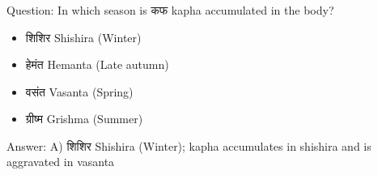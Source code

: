 %
%
%

%
%
%

\begin{frame}[fragile]\frametitle{}

Question: In which season is कफ kapha accumulated in the body?

\begin{itemize}
\item[A)] शिशिर Shishira (Winter)
\item[B)] हेमंत Hemanta (Late autumn)
\item[C)] वसंत Vasanta (Spring)
\item[D)] ग्रीष्म Grishma (Summer)
\end{itemize}

Answer: A) शिशिर Shishira (Winter); kapha accumulates in shishira and is aggravated in vasanta
\end{frame}


